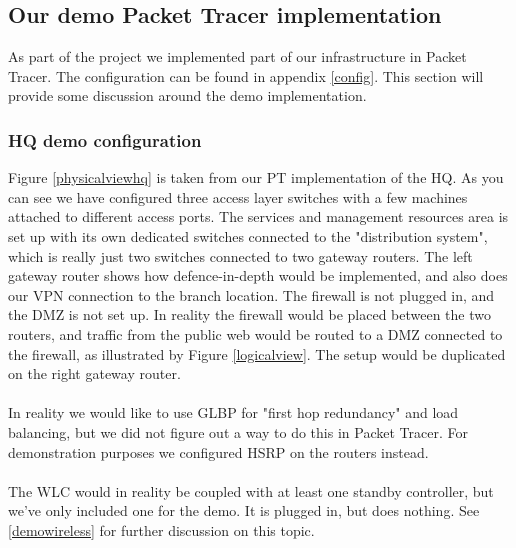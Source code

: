 \subsection{Our demo Packet Tracer implementation}


As part of the project we implemented part of our infrastructure in Packet Tracer. The configuration can be found in appendix \ref{config}. This section will provide some discussion around the demo implementation.

\subsubsection{HQ demo configuration}

Figure \ref{physicalviewhq} is taken from our PT implementation of the HQ. As you can see we have configured three access layer switches with a few machines attached to different access ports. The services and management resources area is set up with its own dedicated switches connected to the "distribution system", which is really just two switches connected to two gateway routers. The left gateway router shows how defence-in-depth would be implemented, and also does our VPN connection to the branch location. The firewall is not plugged in, and the DMZ is not set up. In reality the firewall would be placed between the two routers, and traffic from the public web would be routed to a DMZ connected to the firewall, as illustrated by Figure \ref{logicalview}. The setup would be duplicated on the right gateway router.
\\
\\
In reality we would like to use GLBP for "first hop redundancy" and load balancing, but we did not figure out a way to do this in Packet Tracer. For demonstration purposes we configured HSRP on the routers instead.
\\
\\
The WLC would in reality be coupled with at least one standby controller, but we've only included one for the demo. It is plugged in, but does nothing. See \ref{demowireless} for further discussion on this topic.


